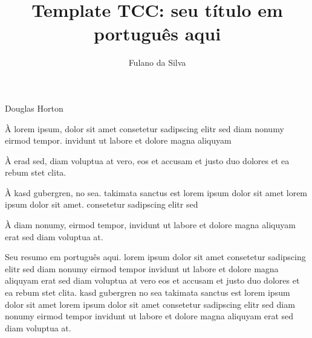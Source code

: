 \documentclass[portuguese,oneside]{UFFStex}
\author{Fulano da Silva}
\title{Template TCC: seu título em português aqui}
      {Template TCC: your title in english here}
\begin{document}
\fichacatalografica




         {Douglas Horton}


\begin{agradecimentos}
À lorem ipsum, dolor sit amet consetetur sadipscing elitr sed diam
nonumy eirmod tempor. invidunt ut labore et dolore magna aliquyam

À erad sed, diam voluptua at vero, eos et accusam et justo duo
dolores et ea rebum stet clita.

À kasd gubergren, no sea. takimata sanctus est lorem ipsum dolor sit
amet lorem ipsum dolor sit amet. consetetur sadipscing elitr sed

À diam nonumy, eirmod tempor, invidunt ut labore et dolore magna
aliquyam erat sed diam voluptua at.
\end{agradecimentos}

\begin{resumo}
Seu resumo em português aqui. lorem ipsum dolor sit amet
consetetur sadipscing elitr sed diam nonumy eirmod tempor invidunt
ut labore et dolore magna aliquyam erat sed diam voluptua at vero
eos et accusam et justo duo dolores et ea rebum stet clita.  kasd
gubergren no sea takimata sanctus est lorem ipsum dolor sit amet
lorem ipsum dolor sit amet consetetur sadipscing elitr sed diam
nonumy eirmod tempor invidunt ut labore et dolore magna aliquyam
erat sed diam voluptua at.
\end{resumo}
\end{document}

